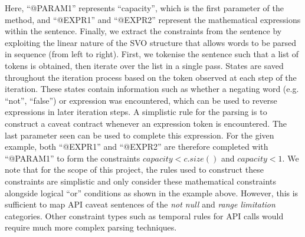 Here, ``@PARAM1'' represents ``capacity'', which is the first parameter of the method, and ``@EXPR1'' and ``@EXPR2'' represent the mathematical expressions within the sentence. Finally, we extract the constraints from the sentence by exploiting the linear nature of the SVO structure that allows words to be parsed in sequence (from left to right). First, we tokenise the sentence such that a list of tokens is obtained, then iterate over the list in a single pass. States are saved throughout the iteration process based on the token observed at each step of the iteration. These states contain information such as whether a negating word (e.g. ``not'', ``false'') or expression was encountered, which can be used to reverse expressions in later iteration steps. A simplistic rule for the parsing is to construct a caveat contract whenever an expression token is encountered. The last parameter seen can be used to complete this expression. For the given example, both ``@EXPR1'' and ``@EXPR2'' are therefore completed with ``@PARAM1'' to form the constraints $capacity<c.size()$ and $capacity<1$. We note that for the scope of this project, the rules used to construct these constraints are simplistic and only consider these mathematical constraints alongside logical ``or'' conditions as shown in the example above. However, this is sufficient to map API caveat sentences of the \textit{not null} and \textit{range limitation} categories. Other constraint types such as temporal rules for API calls would require much more complex parsing techniques.

